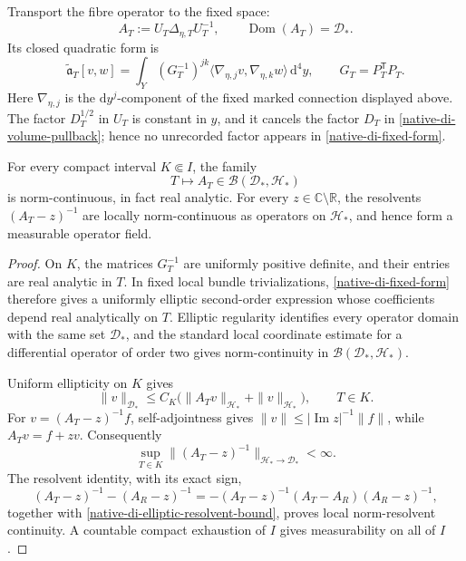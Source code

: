 Transport the fibre operator to the fixed space:
\begin{equation}
 A_T:=U_T\Delta_{\eta,T}U_T^{-1},
 \qquad
 \operatorname{Dom}(A_T)=\mathscr D_*.
\label{native-di-fixed-fibre}
\end{equation}
Its closed quadratic form is
\begin{equation}
 \widetilde{\mathfrak a}_T[v,w]
 =\int_Y(G_T^{-1})^{jk}
  \langle\nabla_{\eta,j}v,\nabla_{\eta,k}w\rangle\,\mathrm d^4y,
 \qquad G_T=P_T^{\mathsf T}P_T.
\label{native-di-fixed-form}
\end{equation}
Here \(\nabla_{\eta,j}\) is the \(\mathrm dy^j\)-component of the fixed
marked connection displayed above.  The factor \(D_T^{1/2}\) in \(U_T\) is
constant in \(y\), and it cancels
the factor \(D_T\) in \eqref{native-di-volume-pullback}; hence no unrecorded
factor appears in \eqref{native-di-fixed-form}.

\begin{lemma}
\label{native-di-common-domain-lemma}
For every compact interval \(K\Subset I\), the family
\[
 T\longmapsto A_T\in\mathcal B(\mathscr D_*,\mathscr H_*)
\]
is norm-continuous, in fact real analytic.  For every
\(z\in\mathbb C\setminus\mathbb R\), the resolvents
\((A_T-z)^{-1}\) are locally norm-continuous as operators on
\(\mathscr H_*\), and hence form a measurable operator field.
\end{lemma}

\begin{proof}
On \(K\), the matrices \(G_T^{-1}\) are uniformly positive definite, and
their entries are real analytic in \(T\).  In fixed local bundle
trivializations, \eqref{native-di-fixed-form} therefore gives a uniformly
elliptic second-order expression whose coefficients depend real
analytically on \(T\).  Elliptic regularity identifies every operator
domain with the same set \(\mathscr D_*\), and the standard local
coordinate estimate for a differential operator of order two gives
norm-continuity in
\(\mathcal B(\mathscr D_*,\mathscr H_*)\).

Uniform ellipticity on \(K\) gives
\[
 \|v\|_{\mathscr D_*}
 \le C_K\bigl(\|A_Tv\|_{\mathscr H_*}
                  +\|v\|_{\mathscr H_*}\bigr),
 \qquad T\in K.
\]
For \(v=(A_T-z)^{-1}f\), self-adjointness gives
\(\|v\|\le|\operatorname{Im}z|^{-1}\|f\|\), while
\(A_Tv=f+zv\).  Consequently
\begin{equation}
 \sup_{T\in K}
 \|(A_T-z)^{-1}\|_{\mathscr H_*\to\mathscr D_*}<\infty.
\label{native-di-elliptic-resolvent-bound}
\end{equation}
The resolvent identity, with its exact sign,
\[
 (A_T-z)^{-1}-(A_R-z)^{-1}
 =-(A_T-z)^{-1}(A_T-A_R)(A_R-z)^{-1},
\]
together with \eqref{native-di-elliptic-resolvent-bound}, proves local
norm-resolvent continuity.  A countable compact exhaustion of \(I\) gives
measurability on all of \(I\).
\end{proof}

